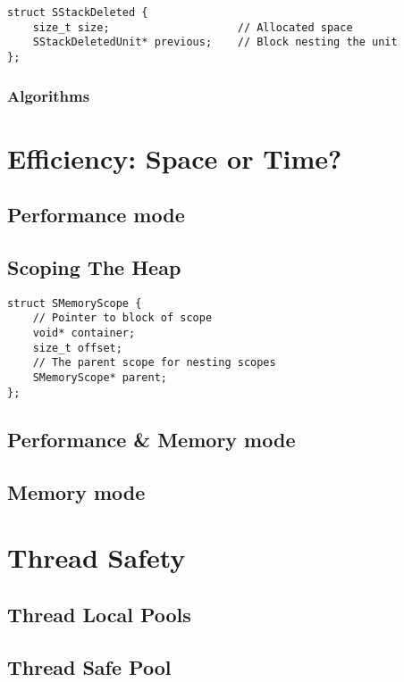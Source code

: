 \documentclass[a4paper, 12pt]{article}
\begin{document}
\begin{verbatim}
struct SStackDeleted {
    size_t size;                    // Allocated space
    SStackDeletedUnit* previous;    // Block nesting the unit
};
\end{verbatim}

\subsubsection{Algorithms}

\section{Efficiency: Space or Time?}

\subsection{Performance mode}

\subsection{Scoping The Heap}
\begin{verbatim}
struct SMemoryScope {
    // Pointer to block of scope
    void* container;
    size_t offset;
    // The parent scope for nesting scopes
    SMemoryScope* parent;
};
\end{verbatim}

\subsection{Performance \& Memory mode}

\subsection{Memory mode}

\section{Thread Safety}

\subsection{Thread Local Pools}

\subsection{Thread Safe Pool}
\end{document}
